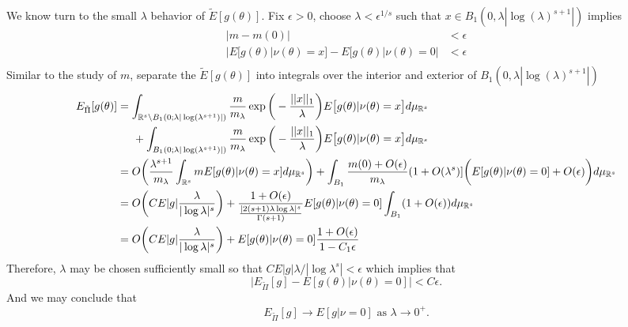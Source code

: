 \documentclass[10pt,fleqn]{article}
\DeclareMathOperator{\1}{\mathbbm{1}}
\begin{document}
{We know turn to the small $\lambda$ behavior of $\tilde{E}[g(\theta)].$  Fix $\epsilon >0$, choose $\lambda<\epsilon^{1/s}$ such that $x\in B_1(0,\lambda|\log(\lambda)^{s+1}|)$ implies
\begin{align*}
|m- m(0)| &< \epsilon \\
|E[g(\theta)|\nu(\theta)=x] - E[g(\theta)|\nu(\theta)=0 | & < \epsilon \\
\end{align*}
Similar to the study of $m$, separate the $\tilde{E}[g(\theta)]$ into integrals over the interior and exterior of $B_1(0,\lambda|\log(\lambda)^{s+1}|)$
\begin{align*}
E_{\tilde{\Pi}}[g(\theta)] &= \int_{\mathbb{R}^s \setminus B_1(0;\lambda|\log(\lambda^{s+1})|)} \frac{m}{m_\lambda}\exp\bigg(-\frac{||x||_1}{\lambda}\bigg) E\big[g(\theta)|\nu(\theta)=x\big] d\mu_{\mathbb{R}^s} \\
&\hspace{0.5 cm} + \int_{B_1(0;\lambda|\log(\lambda^{s+1})|)} \frac{m}{m_\lambda}\exp\bigg(-\frac{||x||_1}{\lambda}\bigg) E\big[g(\theta)|\nu(\theta)=x\big] d\mu_{\mathbb{R}^s} \\
&= O\bigg( \frac{\lambda^{s+1}}{m_\lambda} \int_{\mathbb{R}^s} m E[g(\theta)|\nu(\theta)=x]d\mu_{\mathbb{R}^s}\bigg) + \int_{B_1} \frac{m(0)+O(\epsilon)}{m_\lambda}(1+O(\lambda^s)]\bigg(E[g(\theta)|\nu(\theta)=0] + O(\epsilon)\bigg) d\mu_{\mathbb{R}^s}  \\
&= O\bigg( C E|g|\frac{\lambda}{|\log\lambda|^s}\bigg) + \frac{1+O(\epsilon)}{ \frac{|2(s+1)\lambda \log \lambda |^s}{\Gamma(s+1)} } E[g(\theta)|\nu(\theta) = 0] \int_{B_1}(1+O(\epsilon))d\mu_{\mathbb{R}^s} \\
&=O\bigg(C E|g|\frac{\lambda}{|\log\lambda|^s}\bigg)  +E[g(\theta)|\nu(\theta)=0] \frac{1+O(\epsilon)}{1-C_1\epsilon}
\end{align*}
Therefore, $\lambda$ may be chosen sufficiently small so that $CE|g|\lambda/|\log\lambda^s| < \epsilon $ which implies that 
$$\bigg|E_{\tilde{\Pi}}[g] - E[g(\theta)|\nu(\theta) = 0] \bigg| < C\epsilon.$$
And we may conclude that $$E_{\tilde{\Pi}}[g] \to E[g|\nu = 0] \text{ as } \lambda\to0^+.$$

}



\end{document}
